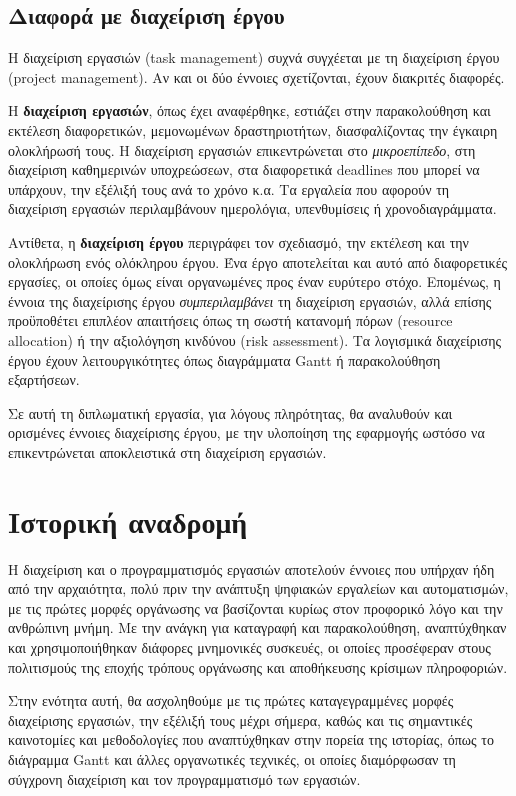         \subsection{Διαφορά με διαχείριση έργου}
            Η διαχείριση εργασιών (task management) συχνά συγχέεται με τη διαχείριση έργου (project management). Αν και οι δύο έννοιες σχετίζονται, έχουν διακριτές διαφορές.

            Η \textbf{διαχείριση εργασιών}, όπως έχει αναφέρθηκε, εστιάζει στην παρακολούθηση και εκτέλεση διαφορετικών, μεμονωμένων δραστηριοτήτων, διασφαλίζοντας την έγκαιρη ολοκλήρωσή τους. Η διαχείριση εργασιών επικεντρώνεται στο \textit{μικροεπίπεδο}, στη διαχείριση καθημερινών υποχρεώσεων, στα διαφορετικά deadlines που μπορεί να υπάρχουν, την εξέλιξή τους ανά το χρόνο κ.α. Τα εργαλεία που αφορούν τη διαχείριση εργασιών περιλαμβάνουν ημερολόγια, υπενθυμίσεις ή χρονοδιαγράμματα.

            Αντίθετα, η \textbf{διαχείριση έργου} περιγράφει τον σχεδιασμό, την εκτέλεση και την ολοκλήρωση ενός ολόκληρου έργου. Ένα έργο αποτελείται και αυτό από διαφορετικές εργασίες, οι οποίες όμως είναι οργανωμένες προς έναν ευρύτερο στόχο. Επομένως, η έννοια της διαχείρισης έργου \textit{συμπεριλαμβάνει} τη διαχείριση εργασιών, αλλά επίσης προϋποθέτει επιπλέον απαιτήσεις όπως τη σωστή κατανομή πόρων (resource allocation) ή την αξιολόγηση κινδύνου (risk assessment). Τα λογισμικά διαχείρισης έργου έχουν λειτουργικότητες όπως διαγράμματα Gantt ή παρακολούθηση εξαρτήσεων.

            Σε αυτή τη διπλωματική εργασία, για λόγους πληρότητας, θα αναλυθούν και ορισμένες έννοιες διαχείρισης έργου, με την υλοποίηση της εφαρμογής ωστόσο να επικεντρώνεται αποκλειστικά στη διαχείριση εργασιών.


    \section{Ιστορική αναδρομή}
        Η διαχείριση και ο προγραμματισμός εργασιών αποτελούν έννοιες που υπήρχαν ήδη από την αρχαιότητα, πολύ πριν την ανάπτυξη ψηφιακών εργαλείων και αυτοματισμών, με τις πρώτες μορφές οργάνωσης να βασίζονται κυρίως στον προφορικό λόγο και την ανθρώπινη μνήμη. Με την ανάγκη για καταγραφή και παρακολούθηση, αναπτύχθηκαν και χρησιμοποιήθηκαν διάφορες μνημονικές συσκευές, οι οποίες προσέφεραν στους πολιτισμούς της εποχής τρόπους οργάνωσης και αποθήκευσης κρίσιμων πληροφοριών.

        Στην ενότητα αυτή, θα ασχοληθούμε με τις πρώτες καταγεγραμμένες μορφές διαχείρισης εργασιών, την εξέλιξή τους μέχρι σήμερα, καθώς και τις σημαντικές καινοτομίες και μεθοδολογίες που αναπτύχθηκαν στην πορεία της ιστορίας, όπως το διάγραμμα Gantt και άλλες οργανωτικές τεχνικές, οι οποίες διαμόρφωσαν τη σύγχρονη διαχείριση και τον προγραμματισμό των εργασιών.

